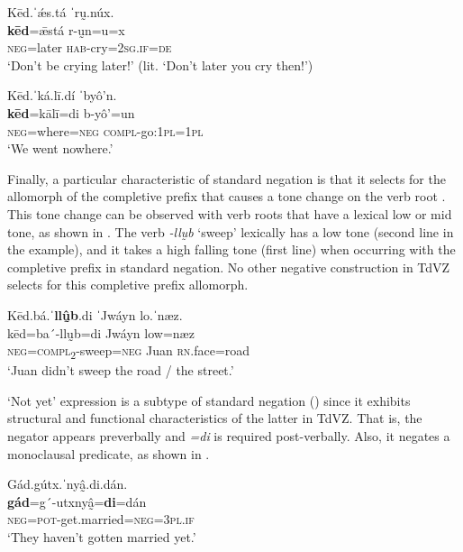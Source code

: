 \documentclass[output=paper,colorlinks=true, citecolor=brown]{langscibook}
\begin{document}
\ea\label{ex:zap:16} 
    \glll Kēd.ˈǽs.tá ˈrṵ.núx.\\ 
          \textbf{kēd}=ǣstá r-ṵn=u=x\\
          \textsc{neg}=later \textsc{hab}{}-cry=\textsc{2sg.if}=\textsc{de}\\
    \glt ‘Don’t be crying later!’ (lit. ‘Don’t later you cry then!’)
\z  

\ea\label{ex:zap:17} 
    \glll Kēd.ˈká.lī.dí ˈbyô’n.\\ 
          \textbf{kēd}=kālī=di b-yô’=un\\
          \textsc{neg}=where=\textsc{neg} \textsc{compl}{}-go:1\textsc{pl}=1\textsc{pl}\\
    \glt ‘We went nowhere.’
\z  

Finally, a particular characteristic of standard negation is that it selects for the allomorph of the completive prefix that causes a tone change on the verb root \citep{GutiérrezEtAl2021}. This tone change can be observed with verb roots that have a lexical low or mid tone, as shown in . The verb \textit{-llṵb} ‘sweep’ lexically has a low tone (second line in the example), and it takes a high falling tone (first line) when occurring with the completive prefix in standard negation. No other negative construction in TdVZ selects for this completive prefix allomorph.

\ea\label{ex:zap:18} 
    \glll Kēd.bá.ˈ\textbf{llṵ̂b}.di ˈJwáyn lo.ˈnæz.\\ 
          kēd=ba´-llṵb=di Jwáyn low=næz\\
          \textsc{neg}=\textsc{compl}\textsc{\textsubscript{2}}{}-sweep=\textsc{neg} Juan \textsc{rn}.face=road\\
    \glt ‘Juan didn’t sweep the road / the street.’
\z 


‘Not yet’ expression is a subtype of standard negation () since it exhibits structural and functional characteristics of the latter in TdVZ. That is, the negator appears preverbally and \textit{=di} is required post-verbally. Also, it negates a monoclausal predicate, as shown in . 

\ea\label{ex:zap:19} 
    \glll Gád.gútx.ˈnyâ̰.di.dán.\\ 
          \textbf{gád}=g´-utxnyâ̰=\textbf{di}=dán\\
          \textsc{neg}=\textsc{pot}{}-get.married=\textsc{neg}=\textsc{3pl.if}\\
    \glt ‘They haven’t gotten married yet.’
\z 
\end{document}
